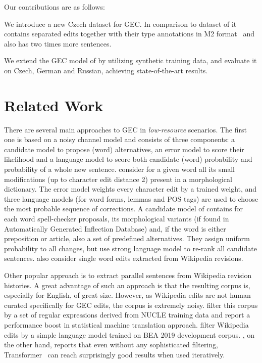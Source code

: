 \documentclass[11pt,a4paper]{article}
\newenvironment{citemize}{\begin{list}{}{\topsep=.1\smallskipamount\itemsep=0pt\parsep=1pt\labelwidth=.5em}}{\end{list}}
\begin{document}
Our contributions are as follows:
\begin{citemize}
  \item We introduce a new Czech dataset for GEC. In comparison to dataset of  it contains separated edits together with their type annotations in M2 format~\cite{dahlmeier2012better} and also has two times more sentences.
  \item We extend the GEC model of  by utilizing synthetic training data, and evaluate it on Czech, German and Russian, achieving state-of-the-art results.
\end{citemize}



\section{Related Work}

There are several main approaches to GEC in \emph{low-resource} scenarios. The first one is based on a noisy channel model and consists of three components: a candidate model to propose (word) alternatives, an error model to score their likelihood and a language model to score both candidate (word) probability and probability of a whole new sentence.  consider for a given word all its small modifications (up to character edit distance 2) present in a morphological dictionary. The error model weights every character edit by a trained weight, and three language models (for word forms, lemmas and POS tags) are used to choose the most probable sequence of corrections. A candidate model of  contains for each word spell-checker proposals, its morphological variants (if found in Automatically Generated Inflection Database) and, if the word is either preposition or article, also a set of predefined alternatives. They assign uniform probability to all changes, but use strong language model to re-rank all candidate sentences.  also consider single word edits extracted from Wikipedia revisions.

Other popular approach is to extract parallel sentences from Wikipedia revision histories. A great advantage of such an approach is that the resulting corpus is, especially for English, of great size. However, as Wikipedia edits are not human curated specifically for GEC edits, the corpus is extremely noisy.  filter this corpus by a set of regular expressions derived from NUCLE training data and report a performance boost in statistical machine translation approach.  filter Wikipedia edits by a simple language model trained on BEA 2019 development corpus. , on the other hand, reports that even without any sophisticated filtering, Transformer~\cite{vaswani2017attention} can reach surprisingly good results when used iteratively.
\end{document}
